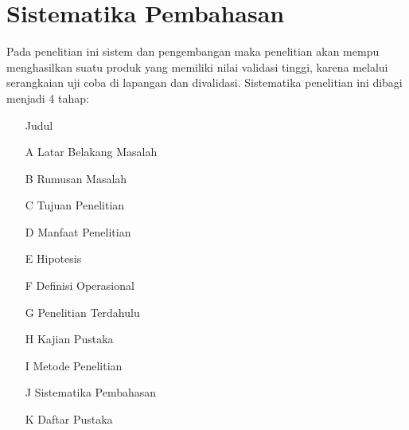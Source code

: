 \section{Sistematika Pembahasan}

Pada penelitian ini sistem dan pengembangan maka penelitian akan mempu menghasilkan suatu produk yang memiliki nilai validasi tinggi, karena melalui serangkaian uji coba di lapangan dan divalidasi. Sistematika penelitian ini dibagi menjadi 4 tahap:

\begin{enumerate}

	\item[]Judul
	\item[A] Latar Belakang Masalah
	\item[B] Rumusan Masalah
		\item[C] Tujuan Penelitian
	\item[D] Manfaat Penelitian
		\item[E] Hipotesis
	\item[F] Definisi Operasional
		\item[G] Penelitian Terdahulu
	\item[H] Kajian Pustaka
		\item[I] Metode Penelitian
	\item[J] Sistematika Pembahasan
 	\item[K] Daftar Pustaka

\end{enumerate}